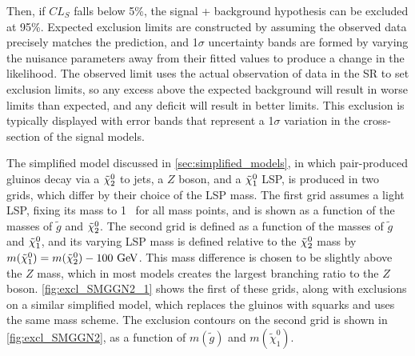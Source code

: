 Then, if $CL_S$ falls below 5\%, the signal + background hypothesis can be excluded at 95\%. Expected exclusion limits are constructed by assuming the observed data precisely matches the prediction, and 1$\sigma$ uncertainty bands are formed by varying the nuisance parameters away from their fitted values to produce a change in the likelihood. The observed limit uses the actual observation of data in the \ac{SR} to set exclusion limits, so any excess above the expected background will result in worse limits than expected, and any deficit will result in better limits. This exclusion is typically displayed with error bands that represent a 1$\sigma$ variation in the cross-section of the signal models. 

The simplified model discussed in \autoref{sec:simplified_models}, in which pair-produced gluinos decay via a $\tilde{\chi}_2^0$ to jets, a $Z$ boson, and a $\tilde{\chi}_1^0$ \ac{LSP}, is produced in two grids, which differ by their choice of the \ac{LSP} mass. The first grid assumes a light \ac{LSP}, fixing its mass to 1 \gev~for all mass points, and is shown as a function of the masses of $\tilde{g}$ and $\tilde{\chi}_2^0$. The second grid is defined as a function of the masses of $\tilde{g}$ and $\tilde{\chi}_1^0$, and its varying \ac{LSP} mass is defined relative to the $\tilde{\chi}_2^0$ mass by $m(\tilde{\chi}^{0}_{1}) = m(\tilde{\chi}^{0}_{2}) - 100 \gev$. This mass difference is chosen to be slightly above the $Z$ mass, which in most models creates the largest branching ratio to the $Z$ boson. \autoref{fig:excl_SMGGN2_1} shows the first of these grids, along with exclusions on a similar simplified model, which replaces the gluinos with squarks and uses the same mass scheme. The exclusion contours on the second grid is shown in \autoref{fig:excl_SMGGN2}, as a function of $m(\tilde{g})$ and $m(\tilde{\chi}^{0}_{1})$.

